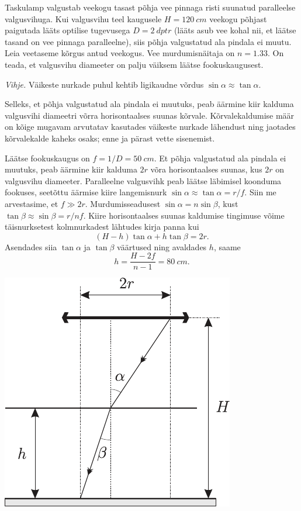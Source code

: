 
Taskulamp valgustab veekogu tasast põhja vee pinnaga risti suunatud paralleelse valgusvihuga. Kui valgusvihu teel kaugusele $H = \SI{120}{cm}$ veekogu põhjast paigutada lääts optilise tugevusega $D = \SI{2}{dptr}$ (lääts asub vee kohal nii, et läätse tasand on vee pinnaga paralleelne), siis põhja valgustatud ala pindala ei muutu. Leia veetaseme kõrgus antud veekogus. Vee murdumisnäitaja on $n = \num{1,33}$. On teada, et valgusvihu diameeter on palju väiksem läätse fookuskaugusest.

\emph{Vihje.} Väikeste nurkade puhul kehtib ligikaudne võrdus $\sin \alpha \approx \tan \alpha$.

\hint
Selleks, et põhja valgustatud ala pindala ei muutuks, peab äärmine kiir kalduma valgusvihi diameetri võrra horisontaalses suunas kõrvale. Kõrvalekaldumise määr on kõige mugavam arvutatav kasutades väikeste nurkade lähendust ning jaotades kõrvalekalde kaheks osaks; enne ja pärast vette sisenemist.

\solu

Läätse fookuskaugus on $f=1 / D=\SI{50}{cm}$. Et põhja valgustatud ala pindala ei muutuks, peab äärmine kiir kalduma $2 r$ võra horisontaalses suunas, kus $2 r$ on valgusvihu diameeter. Paralleelne valgusvihk peab läätse läbimisel koonduma fookuses, seetõttu äärmise kiire langemisnurk $\sin \alpha \approx \tan \alpha=r / f$. Siin me arvestasime, et $f \gg 2 r$. Murdumisseadusest $\sin \alpha=n \sin \beta$, kust $\tan \beta \approx \sin \beta=r / n f$. Kiire horisontaalses suunas
kaldumise tingimuse võime täisnurksetest kolmnurkadest lähtudes kirja panna kui
$$
(H-h) \tan \alpha+h \tan \beta=2 r.
$$
Asendades siia $\tan \alpha$ ja $\tan \beta$ väärtused ning avaldades $h$, saame
$$
h=\frac{H-2 f}{n-1}=\SI{80}{cm}.
$$
\begin{center}
	\includegraphics[width=0.5\linewidth]{2004-lahg-03-lah.pdf}
\end{center}
\probend